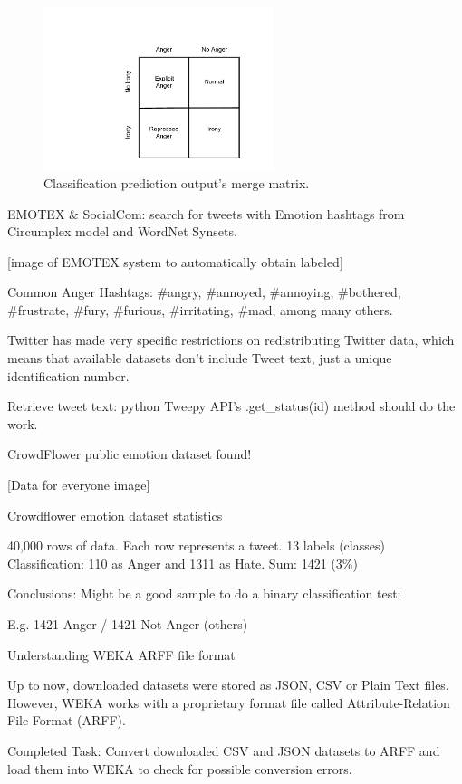 \begin{figure}[!htp]
  \center
  \includegraphics[width=0.6\textwidth]{figures/merge_matrix}
  \caption{Classification prediction output's merge matrix.}
  \label{fig:merge_matrix}
\end{figure}

\iffalse

EMOTEX \& SocialCom: search for tweets with Emotion hashtags from Circumplex model and WordNet Synsets.

[image of EMOTEX system to automatically obtain labeled]

Common Anger Hashtags:
\#angry, \#annoyed, \#annoying, \#bothered, \#frustrate, \#fury, \#furious, \#irritating, \#mad, among many others.

Twitter has made very specific restrictions on redistributing Twitter data, which means that available datasets don't include Tweet text, just a unique identification number.

Retrieve tweet text: python Tweepy API's .get\_status(id) method should do the work.

CrowdFlower public emotion dataset found!

[Data for everyone image]

Crowdflower emotion dataset statistics

40,000 rows of data.
Each row represents a tweet.
13 labels (classes)
Classification: 110 as Anger and 1311 as Hate. Sum: 1421 (3\%)

Conclusions:
Might be a good sample to do a binary classification test:

E.g. 1421 Anger / 1421 Not Anger (others)

Understanding WEKA ARFF file format

Up to now, downloaded datasets were stored as JSON, CSV or Plain Text files. However, WEKA works with a proprietary format file called Attribute-Relation File Format (ARFF).

Completed Task:
Convert downloaded CSV and JSON datasets to ARFF and load them into WEKA to check for possible conversion errors.

